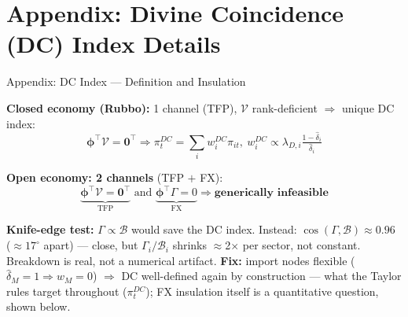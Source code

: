 \section*{Appendix: Divine Coincidence (DC) Index Details}
\begin{frame}{Appendix: DC Index --- Definition and Insulation}

{\scriptsize \textbf{Closed economy (Rubbo):} 1 channel (TFP), $\mathcal V$ rank-deficient $\Rightarrow$ unique DC index:}
\vspace{-3pt}
{\scriptsize\[ \bm\phi^\top\mathcal{V}=\bm 0^\top \Rightarrow \pi^{DC}_t = \textstyle\sum_i w^{DC}_i\pi_{it},\ w^{DC}_i\propto\lambda_{D,i}\tfrac{1-\hat\delta_i}{\hat\delta_i}\]}

{\scriptsize \textbf{Open economy: 2 channels} (TFP $+$ FX):}
\vspace{-3pt}
{\scriptsize\[ \underbrace{\bm\phi^\top\mathcal{V}=\bm 0^\top}_{\text{TFP}} \text{ and } \underbrace{\bm\phi^\top\Gamma = 0}_{\text{FX}} \Rightarrow \textbf{generically infeasible}\]}

\vspace{-2pt}
{\scriptsize \textbf{Knife-edge test:} $\Gamma\propto\mathcal{B}$ would save the DC index. Instead: $\cos(\Gamma,\mathcal{B})\approx0.96$ ($\approx17^\circ$ apart) --- close, but $\Gamma_i/\mathcal{B}_i$ shrinks $\approx$2$\times$ per sector, not constant. Breakdown is real, not a numerical artifact.
\textbf{Fix:} import nodes flexible ($\hat\delta_M{=}1\Rightarrow w_M{=}0$) $\Rightarrow$ DC well-defined again by construction --- what the Taylor rules target throughout ($\pi^{DC}_t$); FX insulation itself is a quantitative question, shown below.}


\end{frame}
